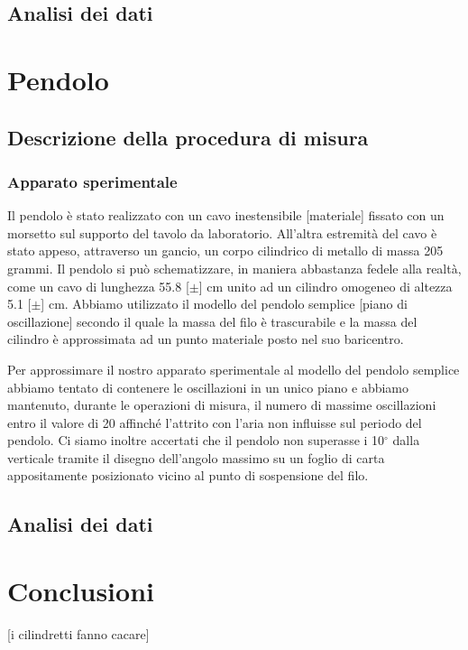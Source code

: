\documentclass[12pt, twoside, a4paper]{article}
\begin{document}
\subsection{Analisi dei dati}

\section{Pendolo}

\subsection{Descrizione della procedura di misura}
\subsubsection{Apparato sperimentale}
Il pendolo è stato realizzato con un cavo inestensibile [materiale] fissato con un morsetto sul supporto del tavolo da laboratorio. All'altra estremità del cavo è stato appeso, attraverso un gancio, un corpo cilindrico di metallo di massa 205 grammi. Il pendolo si può schematizzare, in maniera abbastanza fedele alla realtà, come un cavo di lunghezza 55.8 [$\pm$] cm unito ad un cilindro omogeneo di altezza 5.1 [$\pm$] cm. Abbiamo utilizzato il modello del pendolo semplice [piano di oscillazione] secondo il quale la massa del filo è trascurabile e la massa del cilindro è approssimata ad un punto materiale posto nel suo baricentro.

Per approssimare il nostro apparato sperimentale al modello del pendolo semplice abbiamo tentato di contenere le oscillazioni in un unico piano e abbiamo mantenuto, durante le operazioni di misura, il numero di massime oscillazioni entro il valore di 20 affinché l'attrito con l'aria non influisse sul periodo del pendolo. Ci siamo inoltre accertati che il pendolo non superasse i 10$^\circ$ dalla verticale tramite il disegno dell'angolo massimo su un foglio di carta appositamente posizionato vicino al punto di sospensione del filo.
 
\subsection{Analisi dei dati}

\section{Conclusioni}
[i cilindretti fanno cacare]
\end{document}
